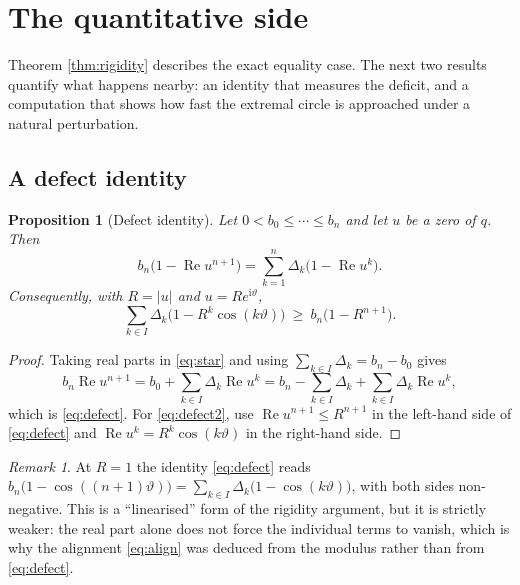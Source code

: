 \documentclass[11pt]{amsart}
\theoremstyle{plain}
\newtheorem{proposition}[theorem]{Proposition}
\theoremstyle{definition}
\theoremstyle{remark}
\newtheorem{remark}[theorem]{Remark}
\newcommand{\ii}{\mathrm{i}}
\newcommand{\abs}[1]{\lvert #1\rvert}
\begin{document}
\section{The quantitative side}\label{sec:quant}

Theorem \ref{thm:rigidity} describes the exact equality case. The next two results quantify
what happens nearby: an identity that measures the deficit, and a computation that shows how
fast the extremal circle is approached under a natural perturbation.

\subsection{A defect identity}

\begin{proposition}[Defect identity]\label{prop:defect}
Let $0<b_0\le\cdots\le b_n$ and let $u$ be a zero of $q$. Then
\begin{equation}\label{eq:defect}
b_n\bigl(1-\operatorname{Re}u^{n+1}\bigr)
=\sum_{k=1}^{n}\Delta_k\bigl(1-\operatorname{Re}u^{k}\bigr).
\end{equation}
Consequently, with $R=\abs{u}$ and $u=Re^{\ii\vartheta}$,
\begin{equation}\label{eq:defect2}
\sum_{k\in I}\Delta_k\bigl(1-R^{k}\cos(k\vartheta)\bigr)\ \ge\ b_n\bigl(1-R^{n+1}\bigr).
\end{equation}
\end{proposition}

\begin{proof}
Taking real parts in \eqref{eq:star} and using $\sum_{k\in I}\Delta_k=b_n-b_0$ gives
\[
b_n\operatorname{Re}u^{n+1}
=b_0+\sum_{k\in I}\Delta_k\operatorname{Re}u^{k}
=b_n-\sum_{k\in I}\Delta_k+\sum_{k\in I}\Delta_k\operatorname{Re}u^{k},
\]
which is \eqref{eq:defect}. For \eqref{eq:defect2}, use
$\operatorname{Re}u^{n+1}\le R^{n+1}$ in the left-hand side of \eqref{eq:defect} and
$\operatorname{Re}u^{k}=R^{k}\cos(k\vartheta)$ in the right-hand side.
\end{proof}

\begin{remark}\label{rem:defectrigid}
At $R=1$ the identity \eqref{eq:defect} reads
$b_n\bigl(1-\cos((n+1)\vartheta)\bigr)=\sum_{k\in I}\Delta_k\bigl(1-\cos(k\vartheta)\bigr)$,
with both sides non-negative. This is a ``linearised'' form of the rigidity argument, but it
is strictly weaker: the real part alone does not force the individual terms to vanish, which
is why the alignment \eqref{eq:align} was deduced from the modulus rather than from
\eqref{eq:defect}.
\end{remark}
\end{document}
